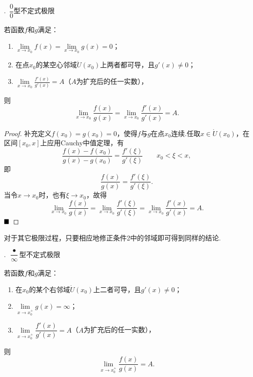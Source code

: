 {.\ $\dfrac{0}{0}$型不定式极限}
\begin{theorem}
	若函数$f$和$g$满足：
	\begin{enumerate}
		\item $\lim\limits_{x\to x_0}f(x)=\lim\limits_{x\to x_0}g(x)=0$；
		\item 在点$x_0$的某空心邻域$\mathring{U}(x_0)$上两者都可导，且$g'(x)\neq 0$；
		\item $\lim\limits_{x\to x_0}\frac{f'(x)}{g'(x)}=A$（$A$为扩充后的任一实数），
	\end{enumerate}
	则
	$$\lim\limits_{x\to x_0}\frac{f(x)}{g(x)}=\lim\limits_{x\to x_0}\frac{f'(x)}{g'(x)}=A.$$
\end{theorem}
\begin{proof}
	补充定义$f(x_0)=g(x_0)=0$，使得$f$与$g$在点$x_0$连续.任取$x\in \mathring{U}(x_0)$，在区间$\left[x_0,x\right]$上应用Cauchy中值定理，有
	$$\frac{f(x)-f(x_0)}{g(x)-g(x_0)}=\frac{f'(\xi)}{g'(\xi)}\qquad x_0<\xi<x,$$即
	$$\frac{f(x)}{g(x)}=\frac{f'(\xi)}{g'(\xi)}.$$
	当令$x\to x_0$时，也有$\xi\to x_0$，故得
	$$\lim\limits_{x\to x_0}\frac{f(x)}{g(x)}=\lim\limits_{x\to x_0}\frac{f'(\xi)}{g'(\xi)}=\lim\limits_{x\to x_0}\frac{f'(x)}{g'(x)}=A.$$
	$\hfill\blacksquare$
\end{proof}
\begin{remark}
	对于其它极限过程，只要相应地修正条件2中的邻域即可得到同样的结论.
\end{remark}
{.\ $\dfrac{\bullet}{\infty}$型不定式极限}
\begin{theorem}
	若函数$f$和$g$满足：
	\begin{enumerate}
		\item 在$x_0$的某个右邻域$\mathring{U}(x_0)$上二者可导，且$g'(x)\neq 0$；
		\item $\lim\limits_{x\to x_0^+}g(x)=\infty$；
		\item $\lim\limits_{x\to x_0^+}\dfrac{f'(x)}{g'(x)}=A$（$A$为扩充后的任一实数），
	\end{enumerate}
	则$$\lim\limits_{x\to x_0^+}\frac{f(x)}{g(x)}=A.$$
\end{theorem}
